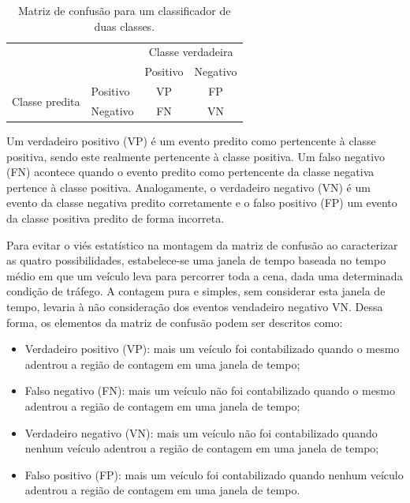 \begin{table}[ht]
  \caption{Matriz de confusão para um classificador de duas classes.}
  \label{tab:matriz_de_confusao}
  \begin{center}
    \begin{tabular}{l|l|c|c|}

    \multicolumn{2}{c}{} & \multicolumn{2}{c}{Classe verdadeira} \\
    \cline{3-4}
    \multicolumn{2}{c|}{} & Positivo & Negativo \\
    \cline{2-4}
    \multirow{2}{*}{Classe predita} & Positivo & VP & FP \\
    \cline{2-4}
    & Negativo & FN & VN \\
    \cline{2-4}
    
    \end{tabular}
  \end{center}
\end{table}

Um verdadeiro positivo (VP) é um evento predito como pertencente à classe positiva, sendo este realmente pertencente à classe positiva. Um falso negativo (FN) acontece quando o evento predito como pertencente da classe negativa pertence à classe positiva. Analogamente, o verdadeiro negativo (VN) é um evento da classe negativa predito corretamente e o falso positivo (FP) um evento da classe positiva predito de forma incorreta.

Para evitar o viés estatístico na montagem da matriz de confusão ao caracterizar as quatro possibilidades, estabelece-se uma janela de tempo baseada no tempo médio em que um veículo leva para percorrer toda a cena, dada uma determinada condição de tráfego. A contagem pura e simples, sem considerar esta janela de tempo, levaria à não consideração dos eventos vendadeiro negativo VN. Dessa forma, os elementos da matriz de confusão podem ser descritos como:

\begin{itemize}
  \item Verdadeiro positivo (VP): mais um veículo foi contabilizado quando o mesmo adentrou a região de contagem em uma janela de tempo;
  \item Falso negativo (FN): mais um veículo não foi contabilizado quando o mesmo adentrou a região de contagem em uma janela de tempo;
  \item Verdadeiro negativo (VN): mais um veículo não foi contabilizado quando nenhum veículo adentrou a região de contagem em uma janela de tempo;
  \item Falso positivo (FP): mais um veículo foi contabilizado quando nenhum veículo adentrou a região de contagem em uma janela de tempo.
\end{itemize}

